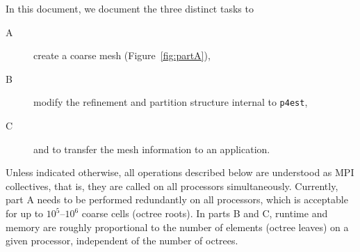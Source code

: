 \documentclass[letterpaper,11pt]{article}
\newcommand{\pforest}{\texttt{p4est}\xspace}
\newcommand{\figref}[1]{Figure~\ref{fig:#1}}
\begin{document}
In this document, we document the three distinct tasks to
\begin{description}
\item[A] create a coarse mesh (\figref{partA}),
\item[B] modify the refinement and partition structure internal to \pforest,
\item[C] and to transfer the mesh information to an application.
\end{description}
Unless indicated otherwise, all operations described below are understood as
MPI collectives, that is, they are called on all processors simultaneously.
Currently, part A needs to be performed redundantly on all processors, which is
acceptable for up to $10^5$--$10^6$ coarse cells (octree roots).  In parts B
and C, runtime and memory are roughly proportional to the number of elements
(octree leaves) on a given processor, independent of the number of octrees.
\end{document}
